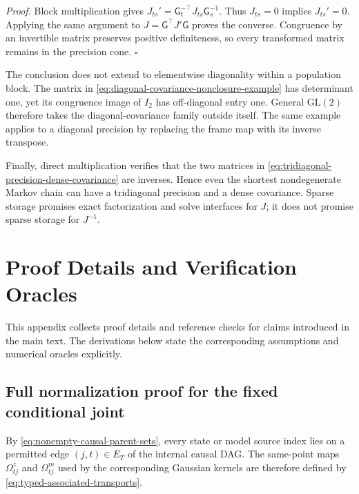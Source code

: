 \emph{Proof.}
Block multiplication gives $J_{ts}'=\mathsf G_t^{-\top}J_{ts}\mathsf G_s^{-1}$.  Thus $J_{ts}=0$ implies $J_{ts}'=0$.  Applying the same argument to $J=\mathsf G^\top J'\mathsf G$ proves the converse.  Congruence by an invertible matrix preserves positive definiteness, so every transformed matrix remains in the precision cone.  \hfill$\square$

The conclusion does not extend to elementwise diagonality within a population block.  The matrix in \cref{eq:diagonal-covariance-nonclosure-example} has determinant one, yet its congruence image of $I_2$ has off-diagonal entry one.  General $\mathrm{GL}(2)$ therefore takes the diagonal-covariance family outside itself.  The same example applies to a diagonal precision by replacing the frame map with its inverse transpose.

Finally, direct multiplication verifies that the two matrices in \cref{eq:tridiagonal-precision-dense-covariance} are inverses.  Hence even the shortest nondegenerate Markov chain can have a tridiagonal precision and a dense covariance.  Sparse storage promises exact factorization and solve interfaces for $J$; it does not promise sparse storage for $J^{-1}$.

\chapter{Proof Details and Verification Oracles}

This appendix collects proof details and reference checks for claims introduced in the main text. The derivations below state the corresponding assumptions and numerical oracles explicitly.

\section{Full normalization proof for the fixed conditional joint}

By \cref{eq:nonempty-causal-parent-sets}, every state or model source index lies on a permitted edge $(j,t)\in E_T$ of the internal causal DAG. The same-point maps $\Omega^z_{tj}$ and $\Omega^m_{tj}$ used by the corresponding Gaussian kernels are therefore defined by \cref{eq:typed-associated-transports}.

